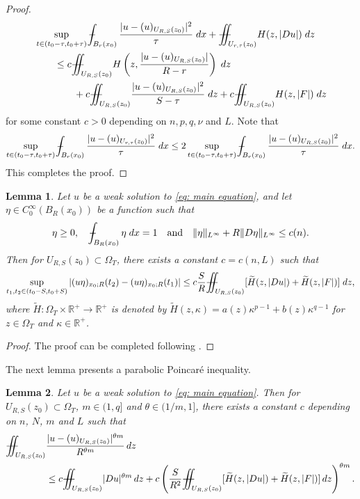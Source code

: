 \documentclass[11pt,oneside, english,reqno,twoside a4paper]{amsart}
\newtheorem{lemma}{Lemma}[section]
\theoremstyle{definition}
\numberwithin{theorem}{section}
\numberwithin{equation}{section}
\def\Xint#1{\mathchoice
	{\XXint\displaystyle\textstyle{#1}}%
	{\XXint\textstyle\scriptstyle{#1}}%
	{\XXint\scriptstyle\scriptscriptstyle{#1}}%
	{\XXint\scriptscriptstyle\scriptscriptstyle{#1}}%
	\!\int}
\def\XXint#1#2#3{{\setbox0=\hbox{$#1{#2#3}{\int}$}
		\vcenter{\hbox{$#2#3$}}\kern-.50\wd0}}
\def\dashint{\Xint-}
\newcommand{ \mr }{ \mathbb{R} }
\newcommand{\iintss}{{\int\hspace{-0.28cm}\int}}
\newcommand{ \miints }{{\iintss\hspace{-0.56cm} -\hspace{-0.15cm}-}}
\newcommand{\miint}[1]{{\miints_{\hspace{-0.13cm}#1}}}
\begin{document}
\begin{proof}
\begin{align*}
        &\sup_{t\in (t_0-\tau,t_0+\tau)}\dashint_{B_r(x_0)} \frac{|u-(u)_{U_{R, S}(z_0)}|^2}{\tau}\; dx + \miint{U_{r,\tau}(z_0)} H(z,|Du|) \;dz\\
        &\qquad \leq c\miint{U_{R,S}(z_0)} H\left(z,\frac{|u-(u)_{U_{R, S}(z_0)}|}{R-r}\right)\; dz\\
        &\qquad \qquad + c \miint{U_{R,S}(z_0)}\frac{|u-(u)_{U_{R,S}(z_0)}|^2}{S-\tau} \; dz +c\miint{U_{R,S}(z_0)} H(z,|F|) \; dz
    \end{align*}
    for some constant $c>0$ depending on $n,p,q,\nu$ and $L$. Note that
    \begin{equation*}
        \sup_{t\in (t_0-\tau,t_0+\tau)}\dashint_{B_r(x_0)} \frac{|u-(u)_{U_{r, \tau}(z_0)}|^2}{\tau}\; dx \leq 2\sup_{t\in (t_0-\tau,t_0+\tau)}\dashint_{B_r(x_0)} \frac{|u-(u)_{U_{R, S}(z_0)}|^2}{\tau}\; dx.
    \end{equation*}
    This completes the proof.
\end{proof}
\begin{lemma}    \label{lem: gluing lemma}
Let $u$ be a weak solution to \eqref{eq: main equation}, and let $\eta\in C_0^\infty(B_R(x_0))$ be a function such that
\begin{equation*}    \label{eq: definition of eta in Lemma 3.2}
\eta\geq 0,\quad \dashint_{B_R(x_0)} \eta \; dx =1 \quad \text{and} \quad \|\eta\|_{L^\infty}+R\|D\eta\|_{L^\infty} \leq c(n).
\end{equation*}
Then for $U_{R,S}(z_0)\subset \Omega_T$, there exists a constant $c=c(n, L)$ such that 
\begin{align*}
\sup_{t_1,t_2\in(t_0-S,t_0+S)}|(u\eta)_{x_0;R}(t_2)-(u\eta)_{x_0;R}(t_1)|
 \leq c\frac{S}{R}\miint{U_{R,S}(z_0)}[\widetilde{H}(z,|Du|)+\widetilde{H}(z,|F|)]\; dz,
\end{align*}
 where $\widetilde{H}:\Omega_T\times \mr^+ \rightarrow \mr^+$ is denoted by $\widetilde{H}(z,\kappa)=a(z)\kappa^{p-1}+b(z)\kappa^{q-1}$ for $z \in \Omega_T$ and $\kappa\in\mr^+$.
\end{lemma}
\begin{proof}
 The proof can be completed following \cite[Lemma 2.4]{2023_Gradient_Higher_Integrability_for_Degenerate_Parabolic_Double-Phase_Systems}.   
\end{proof}
The next lemma presents a parabolic Poincar\'{e} inequality.
\begin{lemma}\label{lem : parabolic poincare inequality in Section 3}
    Let $u$ be a weak solution to \eqref{eq: main equation}. Then for $U_{R,S}(z_0)\subset \Omega_T$, $m\in(1,q]$ and $\theta\in(1/m,1]$, there exists a constant $c$ depending on $n$, $N$, $m$ and $L$ such that 
    \begin{align}\label{eq : parabolic poincare inequality in Section 3}
        \miint{U_{R,S}(z_0)} &\frac{|u-(u)_{U_{R,S}(z_0)}|^{\theta m}}{R^{\theta m}}\, dz \nonumber \\ &\leq c\miint{U_{R,S}(z_0)} |Du|^{\theta m} \,dz +c\left(\frac{S}{R^2}\miint{U_{R,S}(z_0)} [\widetilde{H}(z,|Du|)+\widetilde{H}(z,|F|)]\, dz \right)^{\theta m}.
    \end{align}
\end{lemma}
\end{document}
